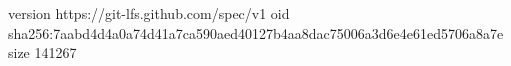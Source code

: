 version https://git-lfs.github.com/spec/v1
oid sha256:7aabd4d4a0a74d41a7ca590aed40127b4aa8dac75006a3d6e4e61ed5706a8a7e
size 141267
